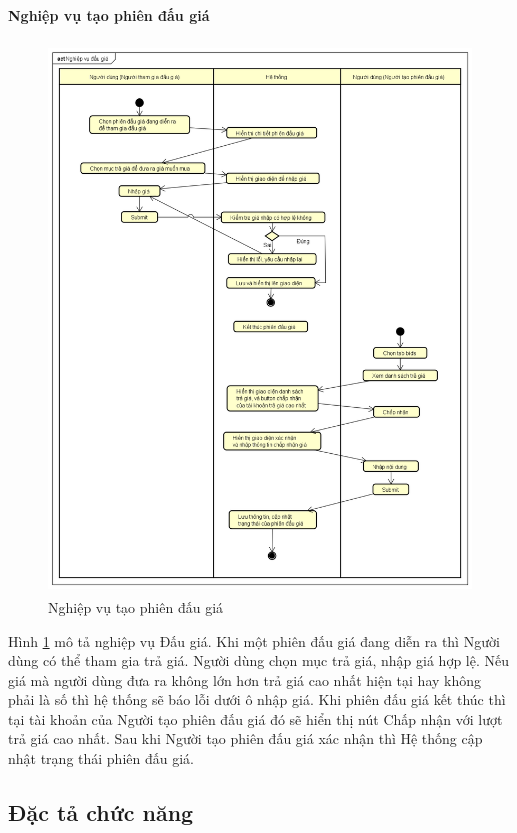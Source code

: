 \documentclass{article}
\begin{document}
\paragraph{Nghiệp vụ tạo phiên đấu giá}\mbox{}
\begin{figure}[H]
    \centering
    \includegraphics[width=11.4cm,height=14.54cm]{images/nghiệp vụ đấu giá.png}
    \caption{Nghiệp vụ tạo phiên đấu giá}
    \label{hinh28}
\end{figure}
Hình \ref{hinh28} mô tả nghiệp vụ Đấu giá. Khi một phiên đấu giá đang diễn ra thì Người dùng có thể tham gia trả giá. Người dùng chọn mục trả giá, nhập giá hợp lệ. Nếu giá mà người dùng đưa ra không lớn hơn trả giá cao nhất hiện tại hay không phải là số thì hệ thống sẽ báo lỗi dưới ô nhập giá. Khi phiên đấu giá kết thúc thì tại tài khoản của Người tạo phiên đấu giá đó sẽ hiển thị nút Chấp nhận với lượt trả giá cao nhất. Sau khi Người tạo phiên đấu giá xác nhận thì Hệ thống cập nhật trạng thái phiên đấu giá.
\subsection{Đặc tả chức năng}
\end{document}

